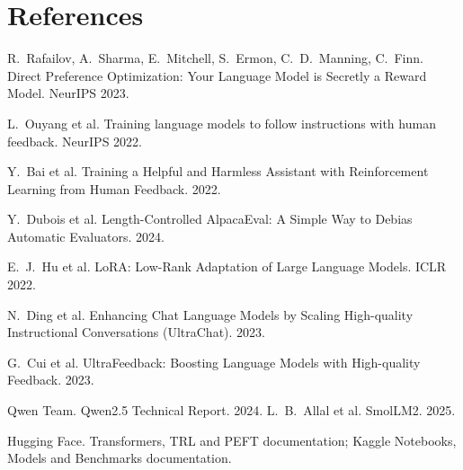 \documentclass[10pt,a4paper]{article}
\begin{document}
\section*{References}
\begin{enumerate}[label={[\arabic*]},leftmargin=2em]
\item R.~Rafailov, A.~Sharma, E.~Mitchell, S.~Ermon, C.~D.~Manning, C.~Finn. Direct Preference Optimization: Your Language Model is Secretly a Reward Model. NeurIPS 2023.
\item L.~Ouyang et al. Training language models to follow instructions with human feedback. NeurIPS 2022.
\item Y.~Bai et al. Training a Helpful and Harmless Assistant with Reinforcement Learning from Human Feedback. 2022.
\item Y.~Dubois et al. Length-Controlled AlpacaEval: A Simple Way to Debias Automatic Evaluators. 2024.
\item E.~J.~Hu et al. LoRA: Low-Rank Adaptation of Large Language Models. ICLR 2022.
\item N.~Ding et al. Enhancing Chat Language Models by Scaling High-quality Instructional Conversations (UltraChat). 2023.
\item G.~Cui et al. UltraFeedback: Boosting Language Models with High-quality Feedback. 2023.
\item Qwen Team. Qwen2.5 Technical Report. 2024. \quad L.~B.~Allal et al. SmolLM2. 2025.
\item Hugging Face. Transformers, TRL and PEFT documentation; Kaggle Notebooks, Models and Benchmarks documentation.
\end{enumerate}
\end{document}
